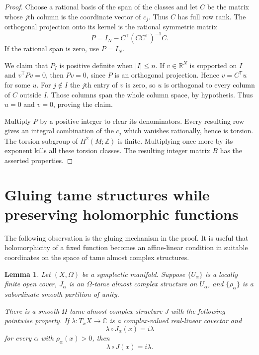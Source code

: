 \documentclass[11pt]{article}
\newtheorem{lemma}[theorem]{Lemma}
\theoremstyle{definition}
\theoremstyle{remark}
\newcommand{\R}{\mathbb R}
\newcommand{\C}{\mathbb C}
\newcommand{\Z}{\mathbb Z}
\begin{document}
\begin{proof}
Choose a rational basis of the span of the classes and let $C$
be the matrix whose $j$th column is the coordinate vector of
$c_j$.  Thus $C$ has full row rank.  The orthogonal projection
onto its kernel is the rational symmetric matrix
\[
P=I_N-C^{\mathsf T}(CC^{\mathsf T})^{-1}C.
\]
If the rational span is zero, use $P=I_N$.

We claim that $P_I$ is positive definite when $|I|\leq n$.
If $v\in\R^N$ is supported on $I$ and
$v^{\mathsf T}Pv=0$, then $Pv=0$, since $P$ is an orthogonal
projection.  Hence $v=C^{\mathsf T}u$ for some $u$.
For $j\notin I$ the $j$th entry of $v$ is zero, so $u$ is
orthogonal to every column of $C$ outside $I$.  Those columns
span the whole column space, by hypothesis.  Thus $u=0$ and
$v=0$, proving the claim.

Multiply $P$ by a positive integer to clear its denominators.
Every resulting row gives an integral combination of the $c_j$
which vanishes rationally, hence is torsion.  The torsion
subgroup of $H^2(M;\Z)$ is finite.  Multiplying once more by
its exponent kills all these torsion classes.  The resulting
integer matrix $B$ has the asserted properties.
\end{proof}

\section{Gluing tame structures while preserving holomorphic functions}

The following observation is the gluing mechanism in the proof.
It is useful that holomorphicity of a fixed function becomes an
affine-linear condition in suitable coordinates on the space of
tame almost complex structures.

\begin{lemma}\label{lem:tame-gluing}
Let $(X,\Omega)$ be a symplectic manifold.  Suppose $\{U_\alpha\}$
is a locally finite open cover, $J_\alpha$ is an $\Omega$-tame
almost complex structure on $U_\alpha$, and $\{\rho_\alpha\}$
is a subordinate smooth partition of unity.

There is a smooth $\Omega$-tame almost complex structure $J$
with the following pointwise property.  If
$\lambda:T_xX\to\C$ is a complex-valued real-linear covector and
\[
\lambda\circ J_\alpha(x)=i\lambda
\]
for every $\alpha$ with $\rho_\alpha(x)>0$, then
\[
\lambda\circ J(x)=i\lambda.
\]
\end{lemma}
\end{document}
